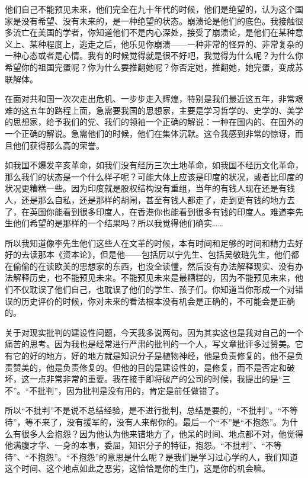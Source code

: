 \documentclass[UTF8, 12pt, a4paper]{ctexrep}
\begin{document}
他们自己不能预见未来，他们完全在九十年代的时候，他们是绝望的，认为这个国家是没有希望、没有未来的，是一种绝望的状态。崩溃论是他们的底色。我接触很多流亡在美国的学者，你知道他们不是内心深处，接受了崩溃论，是他们在某种意义上、某种程度上，逃走之后，他乐见你崩溃——一种非常的怪异的、非常复杂的一种心态或者是心情。我有的时候觉得就是很不好吧，我觉得为什么呢？为什么你希望你的祖国完蛋呢？你为什么要推翻她呢？你否定她，推翻她，她完蛋，变成苏联解体。

在面对共和国一次次走出危机、一步步走入辉煌，特别是我们最近这五年，非常艰难的这五年的路程上面，急需要我国的思想家，主要是学习哲学的、史学的、美学的思想家，给予我们的党、我们的领袖一个正确的解说：一种在国内的、在国外的一个正确的解说。急需他们的时候，他们在集体沉默。这令我感到非常的惊讶，而且他们获得那么高的荣誉。

如我国不爆发辛亥革命，如我们没有经历三次土地革命，如我国不经历文化革命，那么我们的状态是一个什么样子呢？可能大体上应该是印度的状况，或者比印度的状况更糟糕一些。因为印度就是股权结构没有重组，当年的有钱人现在还是有钱人，还是那么自私，还是那样的胡闹，甚至有钱人都走了，走到更有钱的地方去了，在英国你能看到很多印度人，在香港你也能看到很多有钱的印度人。难道李先生他们希望的是那样的一个结果吗？所以我觉得他们确实……

所以我知道像李先生他们这些人在文革的时候，本有时间和足够的时间和精力去好好的去读那本《资本论》，但是他——包括厉以宁先生、包括吴敬琏先生，他们都在偷偷的在读欧美的思想家的东西，也没全读懂，然后没有办法解释现实、没有办法解释历史，也不能预见未来。不能预见未来是最糟糕的，因为不能预见未来，他们不仅耽误了他们自己，也耽误了他们的学生、孩子们。你知道当你形成一个对错误的历史评价的时候，你对未来的看法根本没有机会是正确的，不可能会是正确的。

关于对现实批判的建设性问题，今天我多说两句。因为其实这也是我对自己的一个痛苦的思考。因为我也是经常进行严肃的批判的一个人，写文章批评多过赞美。它有它的好的地方，好的地方就是知识分子是植物神经，他是负责修复的，他不是负责赞美的，他是负责修复的。但他的目的是建设性的，是修复，而不是否定和破坏，这一点非常非常的重要。我在接手即将破产的公司的时候，我提出的是“三不”。“不批判”，因为批判是没有用的，肯定是前任做错了。

所以“不批判”不是说不总结经验，是不进行批判，总结是要的，“不批判”。“不等待”，等不来了，没有援军的，没有人来帮你的。最后一个“不”是“不抱怨”。为什么有很多人会抱怨？因为他认为他来错地方了，他呆的时间、地点都不对，他觉得他满腹才华、一身的本事，委屈，知识分子的特征，抱怨。“不批判”、“不等待”、“不抱怨”。“不抱怨”的意思是什么呢？是我们是学习过心学的人，我们知道这个时间、这个地点如此之恶劣，这恰恰是你的生门，这是你的机会嘛。
\end{document}
